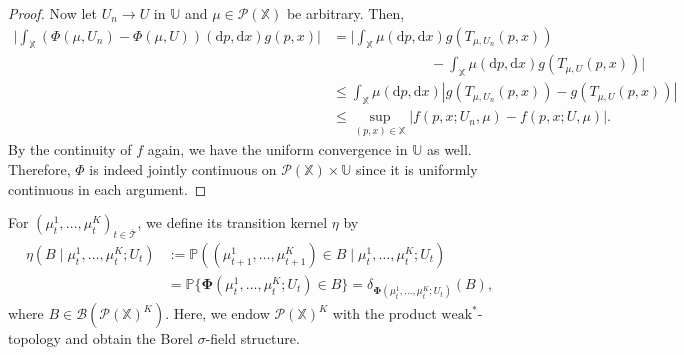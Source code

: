 \documentclass[11pt]{article}
\newcommand{\XX}{\mathbb{X}}
\newcommand{\UU}{\mathbb{U}}
\newcommand{\PP}{\mathbb{P}}
\newcommand{\cB}{\mathcal{B}}
\newcommand{\cP}{\mathcal{P}}
\newcommand{\cT}{\mathcal{T}}
\newcommand{\de}{\mathrm{d}} %
\begin{document}
\begin{proof}
    Now let $U_n\to U$ in $\UU$ and $\mu\in\cP(\XX)$ be arbitrary. Then,
    \begin{align*}
        \bigg|\int_\XX (\Phi(\mu, U_n)-\Phi(\mu, U))(\de p, \de x) g(p,x)\bigg| &= \bigg|\int_\XX \mu(\de p, \de x) g(T_{\mu, U_n}(p,x))\\
        &\hspace{7em}-\int_\XX \mu(\de p,\de x)g(T_{\mu, U}(p,x))\bigg| \\
        &\leq \int_\XX \mu(\de p, \de x) |g(T_{\mu, U_n}(p,x)) - g(T_{\mu, U}(p,x))| \\
        & \leq \sup_{(p,x)\in\XX}|f(p,x; U_n, \mu) - f(p,x; U, \mu)|.
    \end{align*}
    By the continuity of $f$ again, we have the uniform convergence in $\UU$ as well.
    Therefore, $\Phi$ is indeed jointly continuous on $\cP(\XX)\times\UU$ since it is uniformly continuous in each argument.  
\end{proof}

\noindent For $(\mu_t^1,\ldots,\mu_t^K)_{t\in\overline{\cT}}$, we define its transition kernel $\eta$ by
\begin{align}\label{eq:transition-kernel}
    \eta(B \mid \mu_t^1,\ldots,\mu_t^K; U_t) &:= \PP((\mu_{t+1}^1,\ldots,\mu_{t+1}^K)\in B \mid \mu_t^1,\ldots,\mu_t^K; U_t)\\
    &= \PP\{\bm{\Phi}(\mu_t^1,\ldots,\mu_t^K; U_t) \in B\} = \delta_{\bm{\Phi}(\mu_t^1,\ldots,\mu_t^K; U_t)}(B),
\end{align}
where $B\in\cB(\cP(\XX)^K)$. Here, we endow $\cP(\XX)^K$ with the product $\text{weak}^*$-topology and obtain the Borel $\sigma$-field structure.
\end{document}
